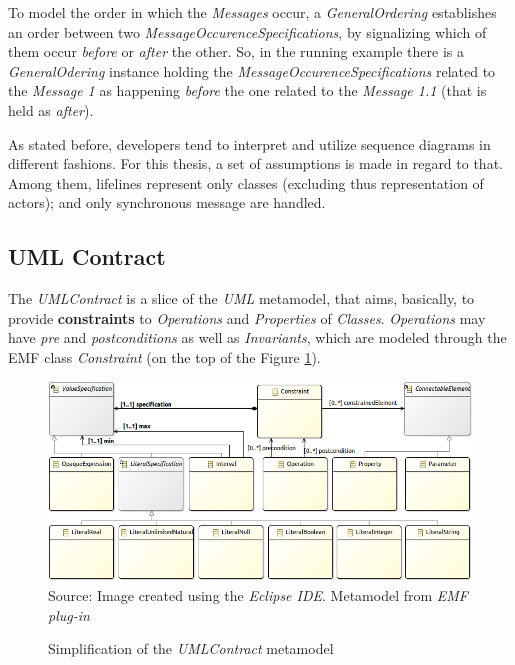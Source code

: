\documentclass[tuberlin,cic,tc,english,noabntcite, oneside]{iiufrgs}
\begin{document}
To model the order in which the \emph{Messages} occur, a \emph{GeneralOrdering} establishes an order between two \emph{MessageOccurenceSpecifications}, by signalizing which of them occur \emph{before} or \emph{after} the other. So, in the running example there is a \emph{GeneralOdering} instance holding the \emph{MessageOccurenceSpecifications} related to the \emph{Message 1} as happening \emph{before} the one related to the \emph{Message 1.1} (that is held as \emph{after}).

As stated before, developers tend to interpret and utilize sequence diagrams in different fashions. For this thesis, a set of assumptions is made in regard to that. Among them, lifelines represent only classes (excluding thus representation of actors); and only synchronous message are handled.

\subsection{UML Contract}
The \emph{UMLContract} is a slice of the \emph{UML} metamodel, that aims, basically, to provide \textbf{constraints} to \emph{Operations} and \emph{Properties} of \emph{Classes}. \emph{Operations} may have \emph{pre} and \emph{postconditions} as well as \emph{Invariants}, which are modeled through the EMF class \emph{Constraint} (on the top of the Figure \ref{fig:uml_metamodel_contracts}).

\begin{figure}[H]
	\centering
    \caption{Simplification of the \emph{UMLContract} metamodel}
    \includegraphics[width=\textwidth]{umlContractSimple01} \\
    Source: Image created using the \emph{Eclipse IDE}. Metamodel from \emph{EMF plug-in}
    \label{fig:uml_metamodel_contracts}
\end{figure}
\end{document}
